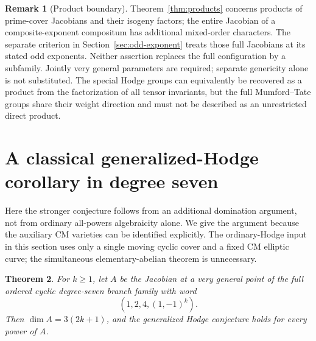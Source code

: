 \documentclass[11pt]{article}
\newtheorem{theorem}{Theorem}[section]
\theoremstyle{definition}
\newtheorem{remark}[theorem]{Remark}
\begin{document}
\begin{remark}[Product boundary]
Theorem~\ref{thm:products} concerns products of prime-cover Jacobians
and their isogeny factors; the entire Jacobian of a composite-exponent
compositum has additional mixed-order characters. The separate criterion
in Section~\ref{sec:odd-exponent} treats those full Jacobians at its
stated odd exponents. Neither assertion replaces the full configuration
by a subfamily. Jointly very general
parameters are required; separate genericity alone is not substituted.
The special Hodge groups can equivalently be recovered as a product from
the factorization of all tensor invariants, but the full Mumford--Tate
groups share their weight direction and must not be described as an
unrestricted direct product.
\end{remark}

\section{A classical generalized-Hodge corollary in degree seven}
\label{sec:ghc7}
Here the stronger conjecture follows from an additional domination argument,
not from ordinary all-powers algebraicity alone. We give the argument because
the auxiliary CM varieties can be identified explicitly. The ordinary-Hodge
input in this section uses only a single moving cyclic cover and a fixed
CM elliptic curve; the simultaneous elementary-abelian theorem is unnecessary.

\begin{theorem}\label{thm:ghc7}
For $k\geq1$, let $A$ be the Jacobian at a very general point of the full
ordered cyclic degree-seven branch family with word
\[
                    (1,2,4,(1,-1)^k).
\]
Then $\dim A=3(2k+1)$, and the generalized Hodge conjecture holds for
every power of $A$.
\end{theorem}
\end{document}
